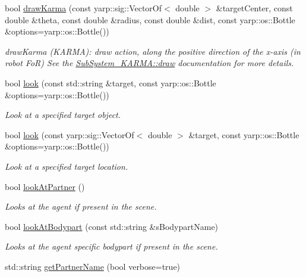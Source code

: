 \begin{DoxyCompactItemize}
bool \hyperlink{group__icubclient__clients_a328124b23108364ed78abced438e88c5}{draw\+Karma} (const yarp\+::sig\+::\+Vector\+Of$<$ double $>$ \&target\+Center, const double \&theta, const double \&radius, const double \&dist, const yarp\+::os\+::\+Bottle \&options=yarp\+::os\+::\+Bottle())
\begin{DoxyCompactList}\small\item\em draw\+Karma (K\+A\+R\+MA)\+: draw action, along the positive direction of the x-\/axis (in robot FoR) See the \hyperlink{group__icubclient__subsystems_a328d7187887b653399ccc783be8fb56e}{Sub\+System\+\_\+\+K\+A\+R\+M\+A\+::draw} documentation for more details. \end{DoxyCompactList}\item 
bool \hyperlink{group__icubclient__clients_ac045289e67ede0aa0a22869600a6021d}{look} (const std\+::string \&target, const yarp\+::os\+::\+Bottle \&options=yarp\+::os\+::\+Bottle())
\begin{DoxyCompactList}\small\item\em Look at a specified target object. \end{DoxyCompactList}\item 
bool \hyperlink{group__icubclient__clients_a54af100e4707843e8e84d9e6c397e4fb}{look} (const yarp\+::sig\+::\+Vector\+Of$<$ double $>$ \&target, const yarp\+::os\+::\+Bottle \&options=yarp\+::os\+::\+Bottle())
\begin{DoxyCompactList}\small\item\em Look at a specified target location. \end{DoxyCompactList}\item 
bool \hyperlink{group__icubclient__clients_a7466b597efdf9ed613ab446e8cb46e25}{look\+At\+Partner} ()
\begin{DoxyCompactList}\small\item\em Looks at the agent if present in the scene. \end{DoxyCompactList}\item 
bool \hyperlink{group__icubclient__clients_aad1592c7eb0b276114fa564ceb20902a}{look\+At\+Bodypart} (const std\+::string \&s\+Bodypart\+Name)
\begin{DoxyCompactList}\small\item\em Looks at the agent specific bodypart if present in the scene. \end{DoxyCompactList}\item 
std\+::string \hyperlink{group__icubclient__clients_acd076c847fe2533127ef55c8ea63034d}{get\+Partner\+Name} (bool verbose=true)

\end{DoxyCompactItemize}
